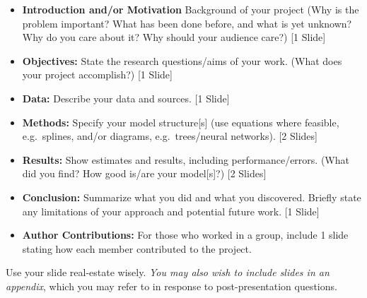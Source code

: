 \documentclass[11pt,twoside]{article}
\makeatletter
\newenvironment{exercise}{\@startsection 
	{section}
	{1}
	{-.2em}
	{-3.5ex plus -1ex minus -.2ex}
    	{1.3ex plus .2ex}
    	{\pagebreak[3]%
	\large\bf\noindent{Part 1.\hspace{-1.5ex} }
	}
	}
\newcommand{\?}{\stackrel{?}{=}}
\makeatother
\begin{document}
\begin{itemize}
\item \textbf{Introduction and/or Motivation} Background of your project (Why is the problem important?  What has been done before, and what is yet unknown?
  Why do you care about it? Why should your audience care?) [1 Slide]
\item \textbf{Objectives:} State the research questions/aims of your work. (What does your project accomplish?) [1 Slide]
\item \textbf{Data:} Describe your data and sources. [1 Slide]
\item \textbf{Methods:} Specify your model structure[s] (use equations where feasible, e.g.\ splines, and/or diagrams, e.g.\ trees/neural networks). [2 Slides]
\item \textbf{Results:} Show estimates and results, including performance/errors. (What did you find? How good is/are your model[s]?) [2 Slides]
\item \textbf{Conclusion:} Summarize what you did and what you discovered. Briefly state any limitations of your approach and potential future work. [1 Slide]
\item \textbf{Author Contributions:} For those who worked in a group, include 1 slide stating how each member contributed to the project.
\end{itemize}
Use your slide real-estate wisely. \textit{You may also wish to include slides in an appendix}, which you may refer to in response to post-presentation questions.





  
\end{document}
